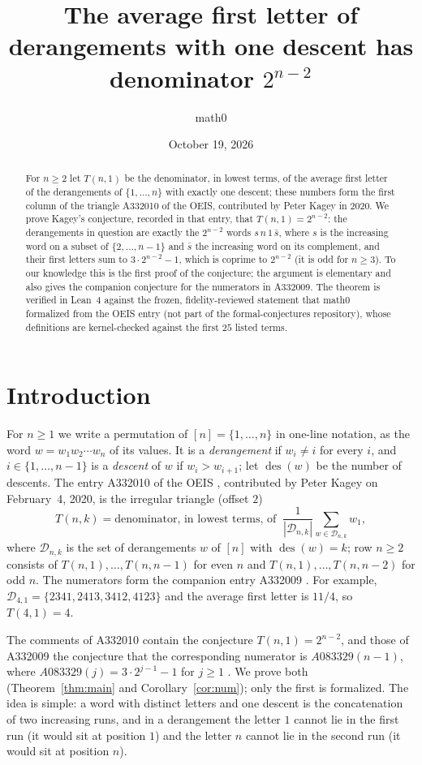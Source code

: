 \documentclass[11pt]{amsart}
\title[Derangements with one descent]{The average first letter of derangements with one descent has denominator $2^{n-2}$}
\author{math0}
\date{October 19, 2026}
\theoremstyle{plain}
\theoremstyle{definition}
\newcommand{\cD}{\mathcal{D}}
\newcommand{\des}{\operatorname{des}}
\begin{document}
\begin{abstract}
For $n\ge2$ let $T(n,1)$ be the denominator, in lowest terms, of the average first letter of the derangements of $\{1,\dots,n\}$ with exactly one descent; these numbers form the first column of the triangle A332010 of the OEIS, contributed by Peter Kagey in 2020.
We prove Kagey's conjecture, recorded in that entry, that $T(n,1)=2^{n-2}$: the derangements in question are exactly the $2^{n-2}$ words $s\,n\,1\,\bar s$, where $s$ is the increasing word on a subset of $\{2,\dots,n-1\}$ and $\bar s$ the increasing word on its complement, and their first letters sum to $3\cdot2^{n-2}-1$, which is coprime to $2^{n-2}$ (it is odd for $n\ge3$).
To our knowledge this is the first proof of the conjecture; the argument is elementary and also gives the companion conjecture for the numerators in A332009.
The theorem is verified in Lean~4 against the frozen, fidelity-reviewed statement that math0 formalized from the OEIS entry (not part of the formal-conjectures repository), whose definitions are kernel-checked against the first $25$ listed terms.
\end{abstract}
\maketitle

\section{Introduction}

For $n\ge1$ we write a permutation of $[n]=\{1,\dots,n\}$ in one-line notation, as the word $w=w_1w_2\cdots w_n$ of its values. It is a \emph{derangement} if $w_i\ne i$ for every $i$, and $i\in\{1,\dots,n-1\}$ is a \emph{descent} of $w$ if $w_i>w_{i+1}$; let $\des(w)$ be the number of descents. The entry A332010 of the OEIS \cite{A332010}, contributed by Peter Kagey on February~4, 2020, is the irregular triangle (offset $2$)
\[
  T(n,k)=\text{denominator, in lowest terms, of }\ \frac{1}{|\cD_{n,k}|}\sum_{w\in\cD_{n,k}}w_1,
\]
where $\cD_{n,k}$ is the set of derangements $w$ of $[n]$ with $\des(w)=k$; row $n\ge2$ consists of $T(n,1),\dots,T(n,n-1)$ for even $n$ and $T(n,1),\dots,T(n,n-2)$ for odd $n$. The numerators form the companion entry A332009 \cite{A332009}. For example, $\cD_{4,1}=\{2341,2413,3412,4123\}$ and the average first letter is $11/4$, so $T(4,1)=4$.

The comments of A332010 contain the conjecture $T(n,1)=2^{n-2}$, and those of A332009 the conjecture that the corresponding numerator is $A083329(n-1)$, where $A083329(j)=3\cdot2^{j-1}-1$ for $j\ge1$ \cite{A083329}. We prove both (Theorem~\ref{thm:main} and Corollary~\ref{cor:num}); only the first is formalized. The idea is simple: a word with distinct letters and one descent is the concatenation of two increasing runs, and in a derangement the letter $1$ cannot lie in the first run (it would sit at position $1$) and the letter $n$ cannot lie in the second run (it would sit at position $n$).
\end{document}
